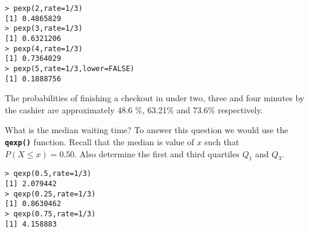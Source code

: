 \begin{verbatim}
> pexp(2,rate=1/3)
[1] 0.4865829
> pexp(3,rate=1/3)
[1] 0.6321206
> pexp(4,rate=1/3)
[1] 0.7364029
> pexp(5,rate=1/3,lower=FALSE)
[1] 0.1888756
\end{verbatim}
The probabilities of finishing a checkout in under two, three and four minutes by the cashier are approximately 48.6 \%, 63.21\% and 73.6\% respectively. 

What is the median waiting time? To answer this question we would use the \texttt{\textbf{qexp()}} function. Recall that the median is value of $x$ such that $P(X \leq x) = 0.50$.
Also determine the first and third quartiles $Q_1$ and $Q_3$.
\begin{verbatim}
> qexp(0.5,rate=1/3)
[1] 2.079442
> qexp(0.25,rate=1/3)
[1] 0.8630462
> qexp(0.75,rate=1/3)
[1] 4.158883
\end{verbatim}
\newpage
